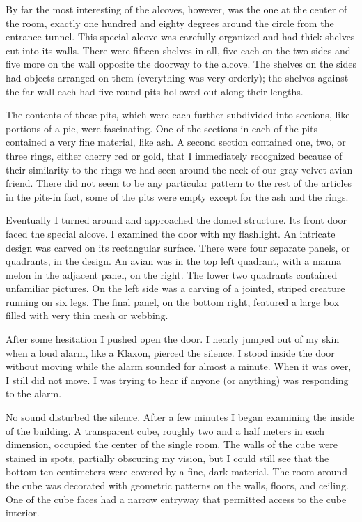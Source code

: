 \documentclass[]{article}
\begin{document}
By far the most interesting of the alcoves, however, was the one at the center of the room, exactly one hundred and eighty degrees around the circle from the entrance tunnel.  This special alcove was carefully organized and had thick shelves cut into its walls.  There were fifteen shelves in all, five each on the two sides and five more on the wall opposite the doorway to the alcove.  The shelves on the sides had objects arranged on them (everything was very orderly); the shelves against the far wall each had five round pits hollowed out along their lengths.

The contents of these pits, which were each further subdivided into sections, like portions of a pie, were fascinating.  One of the sections in each of the pits contained a very fine material, like ash.  A second section contained one, two, or three rings, either cherry red or gold, that I immediately recognized because of their similarity to the rings we had seen around the neck of our gray velvet avian friend.  There did not seem to be any particular pattern to the rest of the articles in the pits-in fact, some of the pits were empty except for the ash and the rings.

Eventually I turned around and approached the domed structure.  Its front door faced the special alcove.  I examined the door with my flashlight.  An intricate design was carved on its rectangular surface.  There were four separate panels, or quadrants, in the design.  An avian was in the top left quadrant, with a manna melon in the adjacent panel, on the right.  The lower two quadrants contained unfamiliar pictures.  On the left side was a carving of a jointed, striped creature running on six legs.  The final panel, on the bottom right, featured a large box filled with very thin mesh or webbing.

After some hesitation I pushed open the door.  I nearly jumped out of my skin when a loud alarm, like a Klaxon, pierced the silence.  I stood inside the door without moving while the alarm sounded for almost a minute.  When it was over, I still did not move.  I was trying to hear if anyone (or anything) was responding to the alarm.

No sound disturbed the silence.  After a few minutes I began examining the inside of the building.  A transparent cube, roughly two and a half meters in each dimension, occupied the center of the single room.  The walls of the cube were stained in spots, partially obscuring my vision, but I could still see that the bottom ten centimeters were covered by a fine, dark material.  The room around the cube was decorated with geometric patterns on the walls, floors, and ceiling.  One of the cube faces had a narrow entryway that permitted access to the cube interior.
\end{document}
